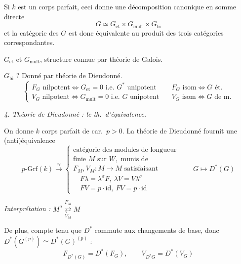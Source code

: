 \documentclass[11pt,a4paper]{article}
\begin{document}

Si $k$ est un corps parfait, ceci donne une décomposition canonique en somme directe
\[
G \simeq G_{\mathrm{et}} \times G_{\mathrm{mult}} \times G_{\mathrm{bi}}
\]
et la catégorie des $G$ est donc équivalente au produit des trois catégories correspondantes.

$G_{\mathrm{et}}$ et $G_{\mathrm{mult}}$, structure connue par théorie de Galois.

$G_{\mathrm{bi}}$ ? Donné par théorie de Dieudonné.
\[
\left\lbrace
\begin{array}{ll}
F_G \text{ nilpotent} \Longleftrightarrow G_{\mathrm{et}} = 0 \text{ i.e.\ } G^{*} \text{ unipotent} & \quad F_G \text{ isom} \Longleftrightarrow G \text{ ét.} \\
V_G \text{ nilpotent} \Longleftrightarrow G_{\mathrm{mult}} = 0 \text{ i.e.\ } G \text{ unipotent} & \quad V_G \text{ isom} \Longleftrightarrow G \text{ de m.}
\end{array}
\right.
\]

\emph{4. Théorie de Dieudonné : le th.\ d'équivalence.}

On donne $k$ corps parfait de car.\ $p > 0$. La théorie de Dieudonné fournit une (anti)équivalence
\[
p\text{-}\mathrm{Grf}(k) \xrightarrow{\;\approx\;} \left\lbrace
\begin{array}{l}
\text{catégorie des modules de longueur} \\
\text{finie } M \text{ sur } W, \text{ munis de} \\
F_M, V_M : M \to M \text{ satisfaisant} \\
\quad F\lambda = \lambda^{\sigma} F,\ \lambda V = V \lambda^{\sigma} \\
\quad FV = p\cdot\mathrm{id},\ FV = p\cdot\mathrm{id}
\end{array}
\right.
\qquad G \longmapsto D^{*}(G)
\]

\emph{Interprétation :} $M^{\sigma} \overset{F_M}{\underset{V_M}{\rightleftarrows}} M$

De plus, \struck{\ill{}} compte tenu que $D^{*}$ commute aux changements de base, donc $D^{*}(G^{(p)}) \simeq D^{*}(G)^{(p)}$ :
\[
F_{D^{*}(G)} = D^{*}(F_G), \qquad V_{D^{*}G} = D^{*}(V_G)
\]
\end{document}
